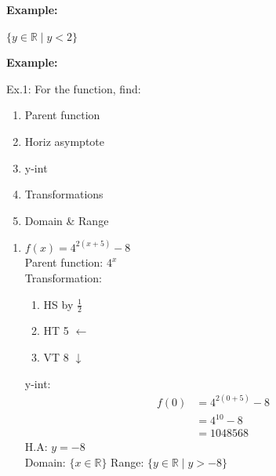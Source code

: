 \documentclass[12pt,a4paper]{article}
\newenvironment{example}
  {\begin{framed}\colorbox{examplecolor}{
  \parbox{\dimexpr\linewidth-2\fboxsep}{
  \textbf{Example:}}}}
  {\end{framed}}
\begin{document}
\begin{example}
\begin{enumerate}
\begin{minipage}{0.8\textwidth}
    \end{minipage}
   \vspace{0.5cm}
   
   $\{y \in \mathbb{R} \mid y < 2\}$   
\end{enumerate}
\end{example}

\newpage 
\begin{example}
    Ex.1: For the function, find:
        \begin{enumerate}
            \item Parent function 
            \item Horiz asymptote
            \item y-int
            \item Transformations
            \item Domain \& Range 
        \end{enumerate}
    \begin{enumerate}[label=\alph*.]
    \item $f(x)= 4^{2(x+5)}-8$ \\
    Parent function: $4^x$ \\
    Transformation: 
    \begin{enumerate}
        \item HS by $\frac{1}{2}$
        \item HT 5 $\gets$
        \item VT 8 $\downarrow$
    \end{enumerate}
    y-int:
    \begin{align*}
        f(0) & = 4^{2(0+5)}-8 \\
        & = 4^{10}-8 \\
        & = 1048568
    \end{align*}
    H.A: $ y= -8$ \\ 
    Domain: $\{x \in \mathbb{R}\}$
    Range:  $\{y \in \mathbb{R} \mid y > -8\}$
    \end{enumerate}
\end{example}
\end{document}
